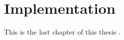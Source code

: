 %
\section{Implementation}\label{sec:implementation}
%
This is the last chapter of this thesis \cite{tur38}.
%
